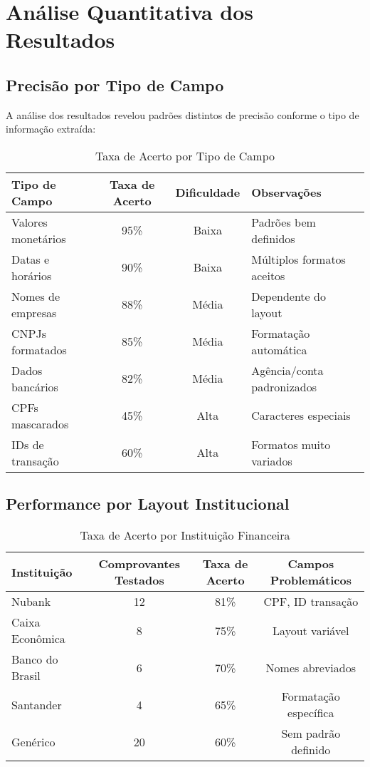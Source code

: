 \section{Análise Quantitativa dos Resultados}

\subsection{Precisão por Tipo de Campo}

A análise dos resultados revelou padrões distintos de precisão conforme o tipo de informação extraída:

\begin{table}[htbp]
\centering
\caption{Taxa de Acerto por Tipo de Campo}
\label{tab:precisao-campos}
\begin{tabular}{|l|c|c|l|}
\hline
\textbf{Tipo de Campo} & \textbf{Taxa de Acerto} & \textbf{Dificuldade} & \textbf{Observações} \\
\hline
Valores monetários & 95\% & Baixa & Padrões bem definidos \\
\hline
Datas e horários & 90\% & Baixa & Múltiplos formatos aceitos \\
\hline
Nomes de empresas & 88\% & Média & Dependente do layout \\
\hline
CNPJs formatados & 85\% & Média & Formatação automática \\
\hline
Dados bancários & 82\% & Média & Agência/conta padronizados \\
\hline
CPFs mascarados & 45\% & Alta & Caracteres especiais \\
\hline
IDs de transação & 60\% & Alta & Formatos muito variados \\
\hline
\end{tabular}
\end{table}

\subsection{Performance por Layout Institucional}

\begin{table}[htbp]
\centering
\caption{Taxa de Acerto por Instituição Financeira}
\label{tab:precisao-instituicao}
\begin{tabular}{|l|c|c|c|}
\hline
\textbf{Instituição} & \textbf{Comprovantes Testados} & \textbf{Taxa de Acerto} & \textbf{Campos Problemáticos} \\
\hline
Nubank & 12 & 81\% & CPF, ID transação \\
\hline
Caixa Econômica & 8 & 75\% & Layout variável \\
\hline
Banco do Brasil & 6 & 70\% & Nomes abreviados \\
\hline
Santander & 4 & 65\% & Formatação específica \\
\hline
Genérico & 20 & 60\% & Sem padrão definido \\
\hline
\end{tabular}
\end{table}


